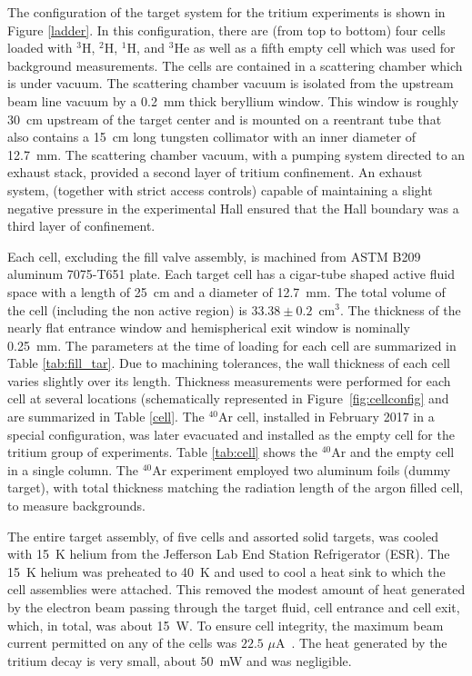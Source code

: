 \documentclass[review,numbers,sort&compress]{elsarticle}
\begin{document}
The configuration of the target system for the tritium experiments is shown in Figure \ref{ladder}. In this configuration, there are (from top to bottom) 
four cells loaded with $^{3}$H, $^{2}$H, $^{1}$H, and $^{3}$He as well as a fifth empty cell which was used for background 
measurements. The cells are contained in a scattering chamber which is under vacuum. The scattering chamber vacuum is isolated 
from the upstream beam line vacuum by a 0.2~mm thick beryllium window. This window is roughly 30~cm upstream of the target center 
and is mounted on a reentrant tube that also contains a 15~cm long tungsten collimator with an inner diameter of 12.7~mm. 
The scattering chamber vacuum, with a pumping system directed to an exhaust stack, provided a second layer of tritium confinement. An 
exhaust system, (together with strict access controls) capable of maintaining a slight negative pressure in the experimental 
Hall ensured that the Hall boundary was a third layer of confinement.

Each cell, excluding the fill valve assembly, is machined from ASTM B209 aluminum 7075-T651 plate. Each target cell has a cigar-tube shaped 
active fluid space with a length of 25~cm and a diameter of 12.7~mm. The total volume of the cell (including the non active region) 
is $33.38 \pm 0.2$~cm$^{3}$. The thickness of the nearly flat entrance window and hemispherical exit window is nominally 0.25~mm. 
The parameters at the time of loading for each cell are summarized in Table \ref{tab:fill_tar}. Due to machining tolerances, the 
wall thickness of each cell varies slightly over its length. Thickness measurements were performed for each cell at several 
locations (schematically represented in Figure~\ref{fig:cellconfig} and are summarized in Table \ref{cell}. The $^{40}$Ar cell, 
installed in February 2017 in a special configuration, was later evacuated and installed as the empty cell for the tritium group 
of experiments. Table \ref{tab:cell} shows the $^{40}$Ar and the empty cell in a single column. The $^{40}$Ar experiment 
employed two aluminum foils (dummy target), with total thickness matching the radiation length of the argon filled cell, 
to measure backgrounds.

The entire target assembly, of five cells and assorted solid targets, was cooled with 15~K helium from 
the Jefferson Lab End Station Refrigerator (ESR). The 15~K helium was preheated to 40~K and used to cool 
a heat sink to which the cell assemblies were attached. This removed the modest amount of heat generated 
by the electron beam passing through the target fluid, cell entrance and cell exit, which, in total, 
was about 15~W.  To ensure cell integrity, the maximum beam current permitted on any of the cells was $22.5$ $\mu$A~\cite{engreport}. 
The heat generated by the tritium decay is very small, about 50~mW and was negligible.
\end{document}
